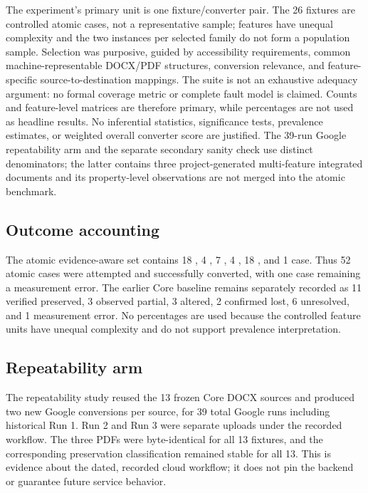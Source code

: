 The experiment's primary unit is one fixture/converter pair. The 26 fixtures are controlled atomic cases, not a representative sample; features have unequal complexity and the two instances per selected family do not form a population sample. Selection was purposive, guided by accessibility requirements, common machine-representable DOCX/PDF structures, conversion relevance, and feature-specific source-to-destination mappings. The suite is not an exhaustive adequacy argument: no formal coverage metric or complete fault model is claimed. Counts and feature-level matrices are therefore primary, while percentages are not used as headline results. No inferential statistics, significance tests, prevalence estimates, or weighted overall converter score are justified. The 39-run Google repeatability arm and the separate secondary sanity check use distinct denominators; the latter contains three project-generated multi-feature integrated documents and its property-level observations are not merged into the atomic benchmark.

\subsection{Outcome accounting}

The atomic evidence-aware set contains 18 \verifiedpreserved{}, 4 \observedpartial{}, 7 \altered{}, 4 \confirmedlost{}, 18 \unresolved{}, and 1 \measured{} case. Thus 52 atomic cases were attempted and successfully converted, with one case remaining a measurement error. The earlier Core baseline remains separately recorded as 11 verified preserved, 3 observed partial, 3 altered, 2 confirmed lost, 6 unresolved, and 1 measurement error. No percentages are used because the controlled feature units have unequal complexity and do not support prevalence interpretation.

\subsection{Repeatability arm}

The repeatability study reused the 13 frozen Core DOCX sources and produced two new Google conversions per source, for 39 total Google runs including historical Run 1. Run 2 and Run 3 were separate uploads under the recorded workflow. The three PDFs were byte-identical for all 13 fixtures, and the corresponding preservation classification remained stable for all 13. This is evidence about the dated, recorded cloud workflow; it does not pin the backend or guarantee future service behavior.

